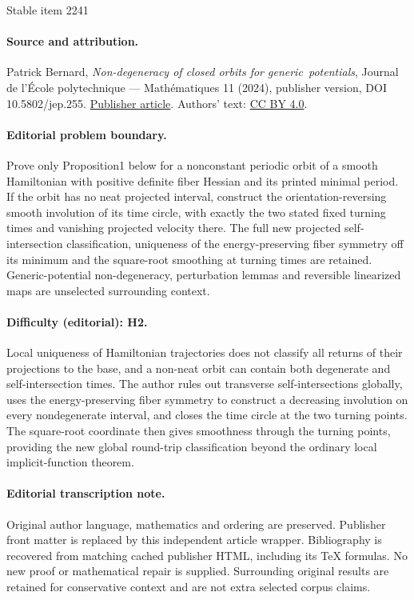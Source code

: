\documentclass[11pt]{article}
\theoremstyle{plain}
\theoremstyle{definition}
\begin{document}
\begin{center}{\Large Stable item 2241}\end{center}
\paragraph{Source and attribution.}
Patrick Bernard, \emph{Non-degeneracy of closed orbits for generic potentials}, Journal de l’École polytechnique — Mathématiques 11 (2024), publisher version, DOI 10.5802/jep.255. \href{https://jep.centre-mersenne.org/articles/10.5802/jep.255/}{Publisher article}. Authors' text: \href{https://creativecommons.org/licenses/by/4.0/}{CC BY 4.0}.
\paragraph{Editorial problem boundary.}
Prove only Proposition1 below for a nonconstant periodic orbit of a smooth Hamiltonian with positive definite fiber Hessian and its printed minimal period. If the orbit has no neat projected interval, construct the orientation-reversing smooth involution of its time circle, with exactly the two stated fixed turning times and vanishing projected velocity there. The full new projected self-intersection classification, uniqueness of the energy-preserving fiber symmetry off its minimum and the square-root smoothing at turning times are retained. Generic-potential non-degeneracy, perturbation lemmas and reversible linearized maps are unselected surrounding context.
\paragraph{Difficulty (editorial): H2.}
Local uniqueness of Hamiltonian trajectories does not classify all returns of their projections to the base, and a non-neat orbit can contain both degenerate and self-intersection times. The author rules out transverse self-intersections globally, uses the energy-preserving fiber symmetry to construct a decreasing involution on every nondegenerate interval, and closes the time circle at the two turning points. The square-root coordinate then gives smoothness through the turning points, providing the new global round-trip classification beyond the ordinary local implicit-function theorem.
\paragraph{Editorial transcription note.}
Original author language, mathematics and ordering are preserved. Publisher front matter is replaced by this independent article wrapper. Bibliography is recovered from matching cached publisher HTML, including its TeX formulas. No new proof or mathematical repair is supplied. Surrounding original results are retained for conservative context and are not extra selected corpus claims.
\clearpage
\end{document}
